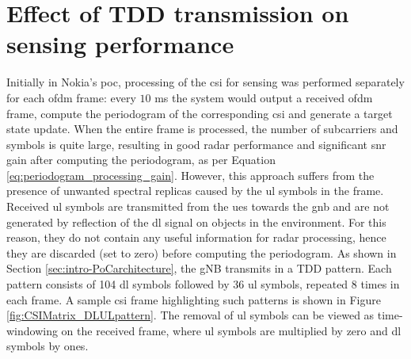 \section{Effect of TDD transmission on sensing performance}
\label{sec:frame_sampling_strategies}
	Initially in Nokia's \gls{poc}, processing of the \gls{csi} for sensing was performed separately for each \gls{ofdm} frame: every $10$ ms the system would output a received \gls{ofdm} frame, compute the periodogram of the corresponding \gls{csi} and generate a target state update. When the entire frame is processed, the number of subcarriers and symbols is quite large, resulting in good radar performance and significant \gls{snr} gain after computing the periodogram, as per Equation \eqref{eq:periodogram_processing_gain}. However, this approach suffers from the presence of unwanted spectral replicas caused by the \gls{ul} symbols in the frame.
	Received \gls{ul} symbols are transmitted from the \glspl{ue} towards the \gls{gnb} and are not generated by reflection of the \gls{dl} signal on objects in the environment.
	For this reason, they do not contain any useful information for radar processing, hence they are discarded (set to zero) before computing the periodogram.
	As shown in Section \ref{sec:intro-PoCarchitecture}, the gNB transmits in a TDD pattern. Each pattern consists of 104 \gls{dl} symbols followed by 36 \gls{ul} symbols, repeated 8 times in each frame. A sample \gls{csi} frame highlighting such patterns is shown in Figure \ref{fig:CSIMatrix_DLULpattern}.
    The removal of \gls{ul} symbols can be viewed as time-windowing on the received frame, where \gls{ul} symbols are multiplied by zero and \gls{dl} symbols by ones.
        
